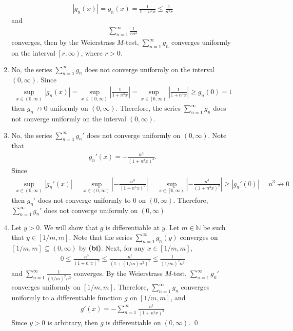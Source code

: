 \documentclass[11pt]{amsart}
\theoremstyle{plain}
\numberwithin{equation}{section}
\begin{document}
\begin{enumerate}[label=\textbf{(\alph*)}]
\begin{enumerate}[label=\textbf{(\roman*)}]
\begin{align*}
    \left|g_{n}(x)\right|=g_{n}(x)=\frac{1}{1+n^{3}x}\leq\frac{1}{n^{3}r}
\end{align*}
and 
\begin{align*}
    \sum_{n=1}^{\infty}\frac{1}{rn^{3}}
\end{align*}
converges, then by the Weierstrass $M$-test, $\sum_{n=1}^{\infty}g_{n}$ converges uniformly on the interval $\left[r,\infty\right)$, where $r>0$.
\item No, the series $\sum_{n=1}^{\infty}g_{n}$ does not converge uniformly on the interval $\left(0,\infty\right)$. Since
\begin{align*}
    \sup_{x\in\left(0,\infty\right)}\left|g_{n}(x)\right|=\sup_{x\in\left(0,\infty\right)}\left|\frac{1}{1+n^{3}x}\right|=\sup_{x\in\left[0,\infty\right)}\left|\frac{1}{1+n^{3}x}\right|\geq g_{n}(0)=1
\end{align*}
then $g_{n}\not\to 0$ uniformly on $\left(0,\infty\right)$. Therefore, the series $\sum_{n=1}^{\infty}g_{n}$ does not converge uniformly on the interval $\left(0,\infty\right)$.
\item No, the series $\sum_{n=1}^{\infty}g_{n}'$ does not converge uniformly on $\left(0,\infty\right)$. Note that
\begin{align*}
    g_{n}'(x)=-\frac{n^{3}}{\left(1+n^{3}x\right)^{2}}.
\end{align*}
Since
\begin{align*}
    \sup_{x\in\left(0,\infty\right)}\left|g_{n}'(x)\right|=\sup_{x\in\left(0,\infty\right)}\left|-\frac{n^{3}}{\left(1+n^{3}x\right)^{2}}\right|=\sup_{x\in\left[0,\infty\right)}\left|-\frac{n^{3}}{\left(1+n^{3}x\right)^{2}}\right|\geq \left|g_{n}'(0)\right|=n^{3}\not\to 0
\end{align*}
then $g_{n}'$ does not converge uniformly to $0$ on $\left(0,\infty\right)$. Therefore, $\sum_{n=1}^{\infty}g_{n}'$ does not converge uniformly on $\left(0,\infty\right)$
\item Let $y>0$. We will show that $g$ is differentiable at $y$. Let $m\in\mathbb{N}$ be such that $y\in\left[1/m,m\right]$. Note that the series $\sum_{n=1}^{\infty}g_{n}(y)$ converges on $\left[1/m,m\right]\subseteq\left(0,\infty\right)$ by \textbf{(bi)}. Next, for any $x\in\left[1/m,m\right]$,
\begin{align*}
    0\leq \frac{n^{3}}{\left(1+n^{3}x\right)^{2}}\leq\frac{n^{3}}{\left(1+(1/m)n^{3}\right)^{2}}\leq\frac{1}{(1/m)^{2}n^{3}}
\end{align*}
and $\sum_{n=1}^{\infty}\frac{1}{(1/m)^{2}n^{3}}$ converges. By the Weierstrass $M$-test, $\sum_{n=1}^{\infty}g_{n}'$ converges uniformly on $\left[1/m,m\right]$. Therefore, $\sum_{n=1}^{\infty}g_{n}$ converges uniformly to a differentiable function $g$ on $\left[1/m,m\right]$, and
\begin{align*}
    g'(x)=-\sum_{n=1}^{\infty}\frac{n^{3}}{\left(1+n^{3}x\right)^{2}}
\end{align*}
Since $y>0$ is arbitrary, then $g$ is differentiable on $\left(0,\infty\right)$. \qed 
    \end{enumerate}
\end{enumerate}
\end{document}
